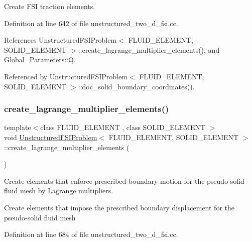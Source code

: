 Create F\+SI traction elements. 



Definition at line 642 of file unstructured\+\_\+two\+\_\+d\+\_\+fsi.\+cc.



References Unstructured\+F\+S\+I\+Problem$<$ F\+L\+U\+I\+D\+\_\+\+E\+L\+E\+M\+E\+N\+T, S\+O\+L\+I\+D\+\_\+\+E\+L\+E\+M\+E\+N\+T $>$\+::create\+\_\+lagrange\+\_\+multiplier\+\_\+elements(), and Global\+\_\+\+Parameters\+::Q.



Referenced by Unstructured\+F\+S\+I\+Problem$<$ F\+L\+U\+I\+D\+\_\+\+E\+L\+E\+M\+E\+N\+T, S\+O\+L\+I\+D\+\_\+\+E\+L\+E\+M\+E\+N\+T $>$\+::doc\+\_\+solid\+\_\+boundary\+\_\+coordinates().

\mbox{\label{classUnstructuredFSIProblem_a6f810c300f373cfc79e23d58f95944e3}} 
\subsubsection{\texorpdfstring{create\+\_\+lagrange\+\_\+multiplier\+\_\+elements()}{create\_lagrange\_multiplier\_elements()}}
{\footnotesize\ttfamily template$<$class F\+L\+U\+I\+D\+\_\+\+E\+L\+E\+M\+E\+NT , class S\+O\+L\+I\+D\+\_\+\+E\+L\+E\+M\+E\+NT $>$ \\
void \hyperlink{classUnstructuredFSIProblem}{Unstructured\+F\+S\+I\+Problem}$<$ F\+L\+U\+I\+D\+\_\+\+E\+L\+E\+M\+E\+NT, S\+O\+L\+I\+D\+\_\+\+E\+L\+E\+M\+E\+NT $>$\+::create\+\_\+lagrange\+\_\+multiplier\+\_\+elements (\begin{DoxyParamCaption}{ }\end{DoxyParamCaption})\hspace{0.3cm}{\ttfamily [private]}}



Create elements that enforce prescribed boundary motion for the pseudo-\/solid fluid mesh by Lagrange multipliers. 

Create elements that impose the prescribed boundary displacement for the pseudo-\/solid fluid mesh 

Definition at line 684 of file unstructured\+\_\+two\+\_\+d\+\_\+fsi.\+cc.



